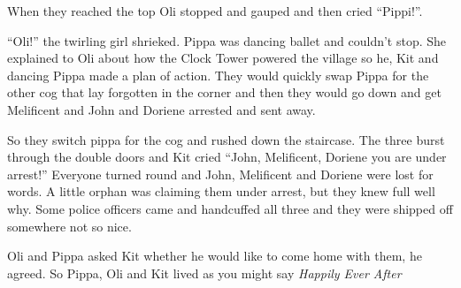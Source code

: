 When they reached the top Oli stopped and gauped and then cried
``Pippi!''.

``Oli!'' the twirling girl shrieked. Pippa was dancing ballet and
couldn't stop. She explained to Oli about how the Clock Tower powered
the village so he, Kit and dancing Pippa made a plan of action. They
would quickly swap Pippa for the other cog that lay forgotten in the
corner and then they would go down and get Melificent and John and
Doriene arrested and sent away.

So they switch pippa for the cog and rushed down the staircase. The
three burst through the double doors and Kit cried ``John, Melificent,
Doriene you are under arrest!'' Everyone turned round and John,
Melificent and Doriene were lost for words. A little orphan was claiming
them under arrest, but they knew full well why. Some police officers
came and handcuffed all three and they were shipped off somewhere not so
nice.

Oli and Pippa asked Kit whether he would like to come home with them, he
agreed. So Pippa, Oli and Kit lived as you might say \emph{\emph{Happily
Ever After}}
